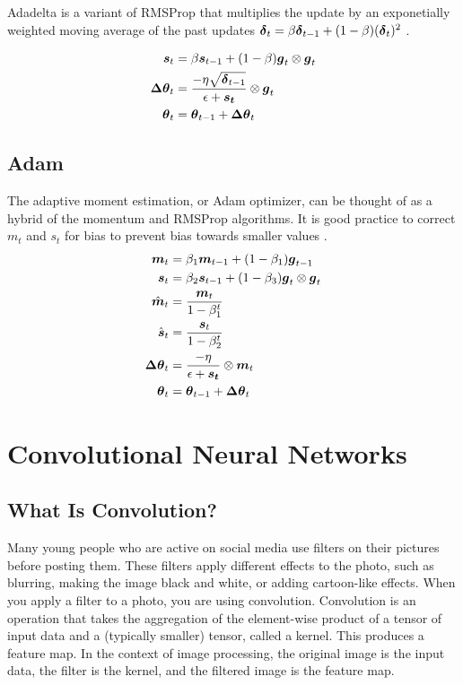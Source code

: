 \documentclass{article}
\begin{document}
Adadelta is a variant of RMSProp that multiplies the update by an exponetially weighted moving average of the past updates \(\vb*{\delta}_t = \beta \vb*{\delta}_{t-1} + (1-\beta)(\vb*{\delta}_t)^2\) \cite{pml1book} \cite{zeiler2012}.

\begin{align*}
    \vb*{s}_t &= \beta \vb*{s}_{t-1} + (1-\beta)\vb*{g}_t \otimes \vb*{g}_t \\
    \vb*{\Delta \theta}_t &= \frac{-\eta \sqrt{\vb*{\delta}_{t-1}}}{\epsilon + \vb*{s_t}} \otimes \vb*{g}_t \\
    \vb*{\theta}_t &= \vb*{\theta}_{t-1} + \vb*{\Delta \theta}_t
\end{align*}

\subsection{Adam} %

The adaptive moment estimation, or Adam optimizer, can be thought of as a hybrid of the momentum and RMSProp algorithms. It is good practice to correct \(m_t\) and \(s_t\) for bias to prevent bias towards smaller values \cite{pml1book}. %
\begin{align*}
    \vb*{m}_t &= \beta_1 \vb*{m}_{t-1} + (1-\beta_1)\vb*{g}_{t-1} \\
    \vb*{s}_t &= \beta_2 \vb*{s}_{t-1} + (1-\beta_3)\vb*{g}_t \otimes \vb*{g}_t \\
    \hat{\vb*{m}}_t &= \frac{\vb*{m}_t}{1-\beta^t_1} \\ 
    \hat{\vb*{s}}_t &= \frac{\vb*{s}_t}{1-\beta^t_2} \\ 
    \vb*{\Delta \theta}_t &= \frac{-\eta}{\epsilon + \vb*{s_t}} \otimes \vb*{m}_t \\
    \vb*{\theta}_t &= \vb*{\theta}_{t-1} + \vb*{\Delta \theta}_t
\end{align*}

\section{Convolutional Neural Networks}


\subsection{What Is Convolution?}

Many young people who are active on social media use filters on their pictures before posting them. These filters apply different effects to the photo, such as blurring, making the image black and white, or adding cartoon-like effects. When you apply a filter to a photo, you are using convolution. Convolution is an operation that takes the aggregation of the element-wise product of a tensor of input data and a (typically smaller) tensor, called a kernel. This produces a feature map. In the context of image processing, the original image is the input data, the filter is the kernel, and the filtered image is the feature map. 
\end{document}
